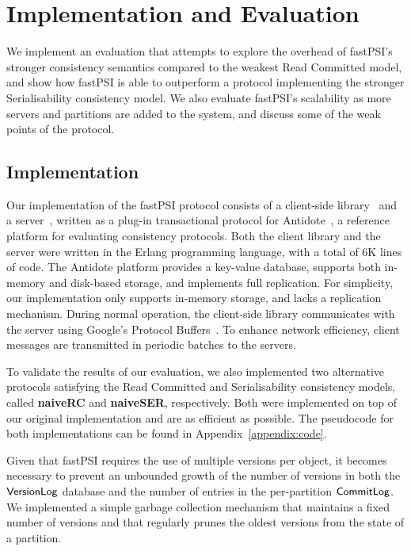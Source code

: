 \cleardoublepage
\chapter{Implementation and Evaluation}
\label{chapter:evaluation}

We implement an evaluation that attempts to explore the overhead of fastPSI's stronger consistency semantics compared to the weakest Read Committed model, and show how fastPSI is able to outperform a protocol implementing the stronger Serialisability consistency model. We also evaluate fastPSI's scalability as more servers and partitions are added to the system, and discuss some of the weak points of the protocol.

\section{Implementation}

Our implementation of the fastPSI protocol consists of a client-side library~\citep{pvc-client} and a server~\citep{pvc-server}, written as a plug-in transactional protocol for Antidote~\citep{antidote-db}, a reference platform for evaluating consistency protocols. Both the client library and the server were written in the Erlang programming language, with a total of 6K lines of code. The Antidote platform provides a key-value database, supports both in-memory and disk-based storage, and implements full replication. For simplicity, our implementation only supports in-memory storage, and lacks a replication mechanism. During normal operation, the client-side library communicates with the server using Google's Protocol Buffers~\citep{protobuf}. To enhance network efficiency, client messages are transmitted in periodic batches to the servers.

To validate the results of our evaluation, we also implemented two alternative protocols satisfying the Read Committed and Serialisability consistency models, called \textbf{naiveRC} and \textbf{naiveSER}, respectively. Both were implemented on top of our original implementation and are as efficient as possible. The pseudocode for both implementations can be found in Appendix~\ref{appendix:code}.

Given that fastPSI requires the use of multiple versions per object, it becomes necessary to prevent an unbounded growth of the number of versions in both the $\mathsf{VersionLog}$ database and the number of entries in the per-partition $\mathsf{CommitLog}$. We implemented a simple garbage collection mechanism that maintains a fixed number of versions and that regularly prunes the oldest versions from the state of a partition.

